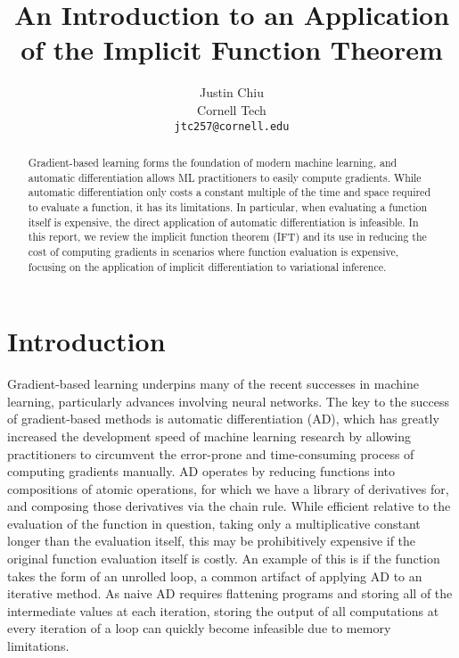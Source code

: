 \documentclass[11pt]{article}
\title{An Introduction to an Application of the Implicit Function Theorem}
\author{Justin Chiu \\
  Cornell Tech \\
  \texttt{jtc257@cornell.edu}}
\begin{document}
\maketitle
\begin{abstract}
Gradient-based learning forms the foundation of modern machine learning,
and automatic differentiation allows ML practitioners to easily compute gradients.
While automatic differentiation only costs a constant multiple of the time and space
required to evaluate a function, it has its limitations.
In particular, when evaluating a function itself is expensive,
the direct application of automatic differentiation is infeasible.
In this report, we review the implicit function theorem (IFT)
and its use in reducing the cost of computing gradients in scenarios where
function evaluation is expensive,
focusing on the application of implicit differentiation to variational inference.
\end{abstract}

\section{Introduction}
\label{sec:intro}
Gradient-based learning underpins many of the recent successes in machine learning,
particularly advances involving neural networks.
The key to the success of gradient-based methods is automatic differentiation (AD),
which has greatly increased the development speed of machine learning research by
allowing practitioners to circumvent the error-prone and time-consuming process
of computing gradients manually.
AD operates by reducing functions into compositions of atomic operations,
for which we have a library of derivatives for,
and composing those derivatives via the chain rule.
While efficient relative to the evaluation of the function in question,
taking only a multiplicative constant longer than the evaluation itself,
this may be prohibitively expensive if the original function evaluation itself is costly.
An example of this is if the function takes the form of an unrolled loop,
a common artifact of applying AD to an iterative method.
As naive AD requires flattening programs and
storing all of the intermediate values at each iteration,
storing the output of all computations at every iteration of a loop can quickly
become infeasible due to memory limitations.
\end{document}
